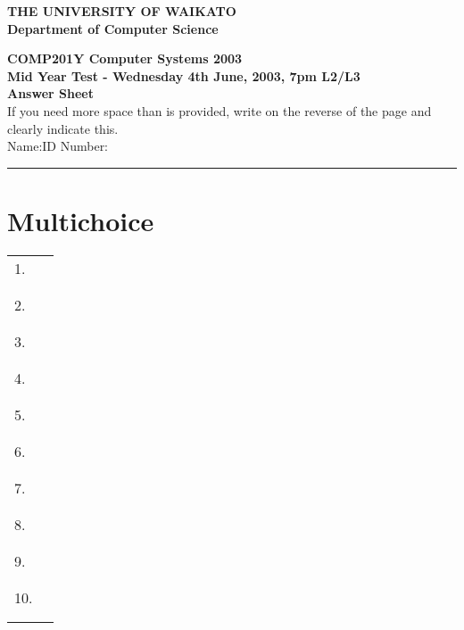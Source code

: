 \documentclass[a4paper,10pt]{article}
\begin{document}
\vspace*{-1cm} 

{\centering \large \bf THE UNIVERSITY OF WAIKATO\\}
{\centering \large \bf Department of Computer Science\\[0.5cm]}

{\centering \large \bf COMP201Y Computer Systems 2003 \\}
{\centering \large \bf Mid Year Test - Wednesday 4th June, 2003, 7pm L2/L3\\[1cm]}
{\centering \large \bf Answer Sheet\\[5mm]}
If you need more space than is provided, write on the reverse of the
page and clearly indicate this.\\[5mm]
Name:\hspace*{5cm}ID Number:\\
\hrule

\section{Multichoice}

\begin{tabular}{p{1.5cm}|p{2cm}|}
\cline{2-2}
1. &  \\
& \\ & \\
\cline{2-2}
2. &  \\
& \\ & \\
\cline{2-2}
3. &  \\
& \\ & \\
\cline{2-2}
4. &  \\
& \\ & \\
\cline{2-2}
5. &  \\
& \\ & \\ 
\cline{2-2}
6. &  \\
& \\ & \\
\cline{2-2}
7. &  \\
& \\ & \\
\cline{2-2}
8. &  \\
& \\ & \\
\cline{2-2}
9. &  \\
& \\ & \\
\cline{2-2}
10. &  \\
& \\ & \\
\cline{2-2}
\end{tabular}
\end{document}
